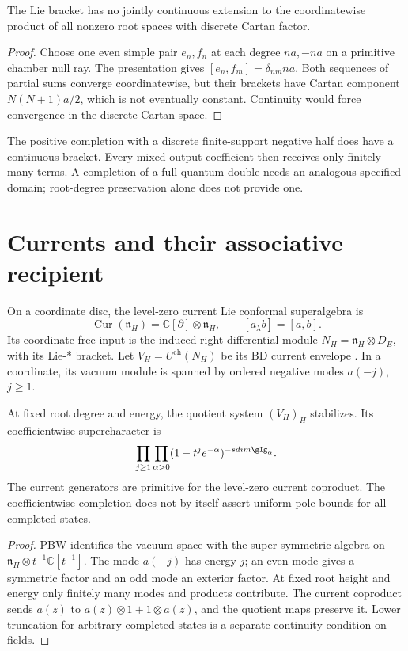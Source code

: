 \begin{proposition}
\label{comp:prop:two-sided-product}
The Lie bracket has no jointly continuous extension to the
coordinatewise product of all nonzero root spaces with discrete
Cartan factor.
\end{proposition}
\begin{proof}
Choose one even simple pair \(e_n,f_n\) at each degree
\(na,-na\) on a primitive chamber null ray. The presentation gives
\([e_n,f_m]=\delta_{nm}na\). Both sequences of partial sums
converge coordinatewise, but their brackets have Cartan component
\(N(N+1)a/2\), which is not eventually constant. Continuity
would force convergence in the discrete Cartan space.
\end{proof}

The positive completion with a discrete finite-support negative
half does have a continuous bracket. Every mixed output coefficient
then receives only finitely many terms. A completion of a full
quantum double needs an analogous specified domain; root-degree
preservation alone does not provide one.
\section{Currents and their associative recipient}
\label{comp:sec:currents}
On a coordinate disc, the level-zero current Lie conformal
superalgebra is
\[
 \operatorname{Cur}(\mathfrak n_H)=\mathbb C[\partial]\otimes
 \mathfrak n_H,\qquad [a_\lambda b]=[a,b].
\]
Its coordinate-free input is the induced right differential module
\(N_H=\mathfrak n_H\otimes D_E\), with its Lie-* bracket.
Let \(V_H=U^{\mathrm{ch}}(N_H)\) be its BD current envelope
\cite{BD04}. In a coordinate, its vacuum module is spanned by ordered
negative modes \(a(-j)\), \(j\geq1\).

\begin{proposition}
\label{comp:prop:current-character}
At fixed root degree and energy, the quotient system \((V_H)_H\)
stabilizes. Its coefficientwise supercharacter is
\[
 \prod_{j\geq1}\prod_{\alpha>0}
       (1-t^je^{-\alpha})^{-\operatorname{sdim}\gIg_\alpha}.
\]
The current generators are primitive for the level-zero current
coproduct. The coefficientwise completion does not by itself assert
uniform pole bounds for all completed states.
\end{proposition}
\begin{proof}
PBW identifies the vacuum space with the super-symmetric algebra
on \(\mathfrak n_H\otimes t^{-1}\mathbb C[t^{-1}]\).
The mode \(a(-j)\) has energy \(j\); an even mode gives a
symmetric factor and an odd mode an exterior factor. At fixed
root height and energy only finitely many modes and products
contribute. The current coproduct sends
\(a(z)\) to \(a(z)\otimes1+1\otimes a(z)\), and the
quotient maps preserve it. Lower truncation for arbitrary completed
states is a separate continuity condition on fields.
\end{proof}

